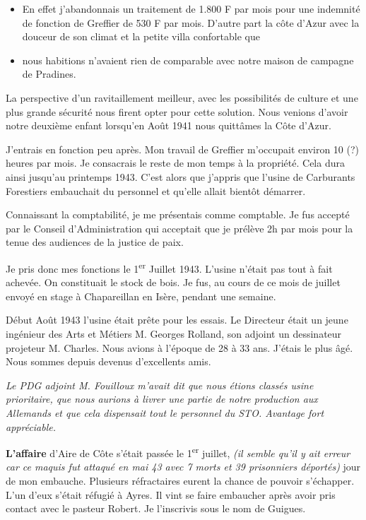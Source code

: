 \begin{itemize}
\item En effet j’abandonnais un traitement de 1.800 F par mois pour une indemnité de fonction de
Greffier de 530 F par mois.
D’autre part la côte d’Azur avec la douceur de son climat et la petite villa confortable que
\item nous habitions n’avaient rien de comparable avec notre maison de campagne de Pradines.
\end{itemize}

La perspective d’un ravitaillement meilleur, avec les possibilités de culture et une plus grande
sécurité nous firent opter pour cette solution. Nous venions d’avoir notre deuxième
enfant lorsqu’en Août 1941 nous quittâmes la Côte d’Azur.

J’entrais en fonction peu après. Mon travail de Greffier m’occupait environ 10 (?) heures par
mois. Je consacrais le reste de mon temps à la propriété. Cela dura ainsi jusqu’au printemps
1943. C’est alors que j’appris que l’usine de Carburants Forestiers embauchait du personnel
et qu’elle allait bientôt démarrer.

Connaissant la comptabilité, je me présentais comme comptable. Je fus accepté par le Conseil
d’Administration qui acceptait que je prélève 2h par mois pour la tenue des audiences de la
justice de paix.

Je pris donc mes fonctions le 1\textsuperscript{er} Juillet 1943. L’usine n’était pas tout à fait achevée. On
constituait le stock de bois. Je fus, au cours de ce mois de juillet envoyé en stage à
Chapareillan en Isère, pendant une semaine.

Début Août 1943 l’usine était prête pour les essais. Le Directeur était un jeune ingénieur des
Arts et Métiers M. Georges Rolland, son adjoint un dessinateur projeteur M. Charles. Nous
avions à l’époque de 28 à 33 ans. J’étais le plus âgé. Nous sommes depuis devenus
d’excellents amis.

\textit{Le PDG adjoint M. Fouilloux m’avait dit que nous étions classés usine prioritaire, que nous aurions à livrer une partie de notre production aux Allemands et que cela dispensait tout le personnel du STO. Avantage fort appréciable.}


\textbf{L’affaire} d’Aire de Côte s’était passée le 1\textsuperscript{er} juillet, \textit{(il semble qu’il y ait erreur car ce maquis fut attaqué en mai 43 avec 7 morts et 39 prisonniers déportés)} jour de mon
embauche. Plusieurs réfractaires eurent la chance de pouvoir s’échapper. L’un d’eux s’était
réfugié à Ayres. Il vint se faire embaucher après avoir pris contact avec le pasteur Robert. Je
l’inscrivis sous le nom de Guigues.

